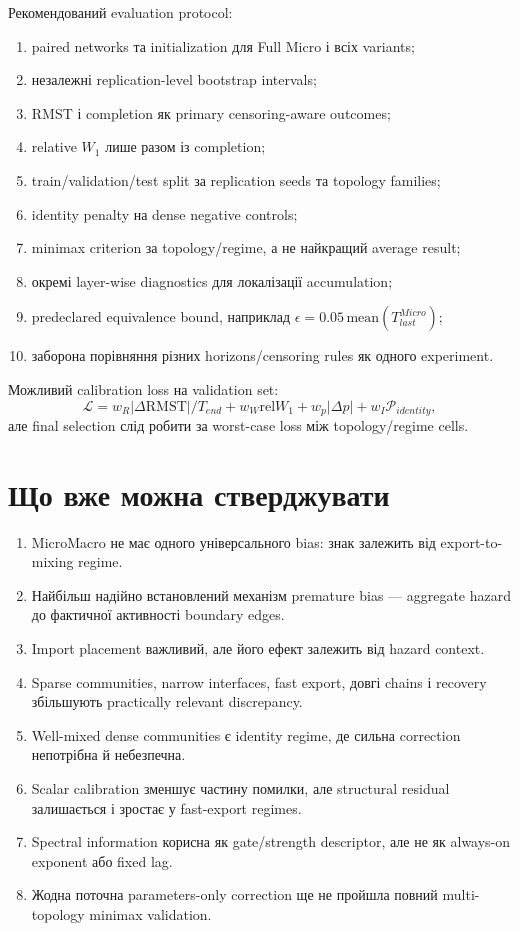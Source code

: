 \documentclass[11pt,a4paper]{article}
\begin{document}
Рекомендований evaluation protocol:
\begin{enumerate}
 \item paired networks та initialization для Full Micro і всіх variants;
 \item незалежні replication-level bootstrap intervals;
 \item RMST і completion як primary censoring-aware outcomes;
 \item relative $W_1$ лише разом із completion;
 \item train/validation/test split за replication seeds та topology families;
 \item identity penalty на dense negative controls;
 \item minimax criterion за topology/regime, а не найкращий average result;
 \item окремі layer-wise diagnostics для локалізації accumulation;
 \item predeclared equivalence bound, наприклад
 $\epsilon=0.05\,\mathrm{mean}(T_{last}^{Micro})$;
 \item заборона порівняння різних horizons/censoring rules як одного experiment.
\end{enumerate}

Можливий calibration loss на validation set:
\[
 \mathcal{L}=w_R|\Delta\mathrm{RMST}|/T_{end}
 +w_W\mathrm{rel}W_1+w_p|\Delta p|+w_I\mathcal{P}_{identity},
\]
але final selection слід робити за worst-case loss між topology/regime cells.

\section{Що вже можна стверджувати}

\begin{enumerate}
 \item MicroMacro не має одного універсального bias: знак залежить від
 export-to-mixing regime.
 \item Найбільш надійно встановлений механізм premature bias --- aggregate
 hazard до фактичної активності boundary edges.
 \item Import placement важливий, але його ефект залежить від hazard context.
 \item Sparse communities, narrow interfaces, fast export, довгі chains і
 recovery збільшують practically relevant discrepancy.
 \item Well-mixed dense communities є identity regime, де сильна correction
 непотрібна й небезпечна.
 \item Scalar calibration зменшує частину помилки, але structural residual
 залишається і зростає у fast-export regimes.
 \item Spectral information корисна як gate/strength descriptor, але не як
 always-on exponent або fixed lag.
 \item Жодна поточна parameters-only correction ще не пройшла повний
 multi-topology minimax validation.
\end{enumerate}
\end{document}
